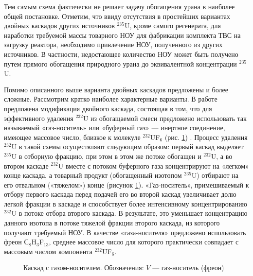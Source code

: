 Тем самым схема фактически не решает задачу обогащения урана в наиболее общей постановке.
Отметим, что ввиду отсутствия в простейших вариантах двойных каскадов других источников $^{235}$U, кроме самого регенерата, для наработки требуемой массы товарного НОУ для фабрикации комплекта ТВС на загрузку реактора, необходимо привлечение НОУ, полученного из других источников. В частности, недостающее количество НОУ может быть получено путем прямого обогащения природного урана до эквивалентной концентрации $^{235}$U.

Помимо описанного выше варианта двойных каскадов предложены и более сложные. Рассмотрим кратко наиболее характерные варианты.
В работе \cite{prusakovKorrekciyaIzotopnogoSostava2008} предложена модификация двойного каскада, состоящая в том, что для эффективного удаления $^{232}$U из обогащаемой смеси предложено использовать так называемый «газ-носитель» или «буферный газ» --- инертное соединение, имеющее массовое число, близкое к молекуле $^{232}$UF$_{6}$ (рис. \ref{p2_gas}) \cite{orlovWayObtainUranium2015, orlovDesublimationPurificationTransporting2017}. Процесс удаления $^{232}$U в такой схемы осуществляют следующим образом: первый каскад выделяет $^{235}$U в отборную фракцию, при этом в этом же потоке обогащен и $^{232}$U, а во втором каскаде $^{232}$U вместе с потоком буферного газа концентрируют на «легком» конце каскада, а товарный продукт (обогащенный изотопом $^{235}$U) отбирают на его отвальном («тяжелом») конце (рисунок \ref{p2_gas}). «Газ-носитель», примешиваемый к отбору первого каскада перед подачей его во второй каскад  увеличивает долю легкой фракции в каскаде и способствует более интенсивному концентрированию $^{232}$U в потоке отбора второго каскада. В результате, это уменьшает концентрацию данного изотопа в потоке тяжелой фракции второго каскада, из которого получают требуемый НОУ. В качестве «газа-носителя» предложено использовать фреон С$_{8}$H$_{3}$F$_{13}$, среднее массовое число для которого практически совпадает с массовым числом компонента $^{232}$UF$_{6}$.

\begin{figure}[ht]
  \caption{Каскад с газом-носителем. Обозначения: $V$ --- газ-носитель (фреон)}\label{p2_gas}
\end{figure}

